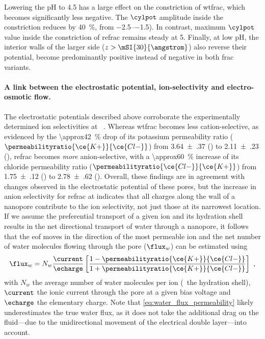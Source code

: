 Lowering the pH to \num{4.5} has a large effect on the constriction of \gls{wtfrac}, which becomes
significantly less negative. The $\cylpot$ amplitude inside the constriction reduces by \SI{40}{\percent},
from \SIrange{-2.5}{-1.5}{\kTe}). In contrast, maximum $\cylpot$ value inside the constriction of \gls{refrac}
remains steady at \SI[retain-explicit-plus]{+5}{\kTe}. Finally, at low pH, the interior walls of the larger
\cisi{} side ($z > \mSI{30}{\angstrom}$) also reverse their potential, become predominantly positive instead
of negative in both \gls{frac} variants.

\paragraph{A link between the electrostatic potential, ion-selectivity and electro-osmotic flow.}
%
%
The electrostatic potentials described above corroborate the experimentally determined ion selectivities at
~\cite{Huang-2017}. Whereas \gls{wtfrac} becomes less cation-selective, as evidenced by the
\SI{\approx42}{\percent} drop of its potassium permeability ratio ($\permeabilityratio{\ce{K+}}{\ce{Cl-}}$)
from \num{3.64(37)} () to \num{2.11(23)} (), \gls{refrac} becomes \emph{more} anion-selective,
with a \SI{\approx60}{\percent} increase of its chloride permeability ratio
($\permeabilityratio{\ce{Cl-}}{\ce{K+}}$) from \num{1.75(12)} () to \num{2.78(62)} ().
Overall, these findings are in agreement with changes observed in the electrostatic potential of these pores,
but the increase in anion selectivity for \gls{refrac} at  indicates that all charges along the wall
of a nanopore contribute to the ion selectivity, not just those at its narrowest location. If we assume the
preferential transport of a given ion and its hydration shell results in the net directional transport of
water through a nanopore, it follows that the \gls{eof} moves in the direction of the most permeable ion and
the net number of water molecules flowing through the pore ($\flux_{w}$) can be estimated
using~\cite{Piguet-2014}
%
\begin{equation}\label{eq:water_flux_permeability}
  \flux_{w} = N_{w} \dfrac{\current}{\echarge} 
    \left[ \dfrac%
        {1 - \permeabilityratio{\ce{K+}}{\ce{Cl-}}}%
        {1 + \permeabilityratio{\ce{K+}}{\ce{Cl-}}}%
    \right]
    \text{ ,}
\end{equation}
%
with $N_{w}$ the average number of water molecules per ion (\ie~the hydration shell), $\current$ the ionic
current through the pore at a given bias voltage and $\echarge$ the elementary charge. Note that
\cref{eq:water_flux_permeability} likely underestimates the true water flux, as it does not take the
additional drag on the fluid---due to the unidirectional movement of the electrical double layer---into
account.

